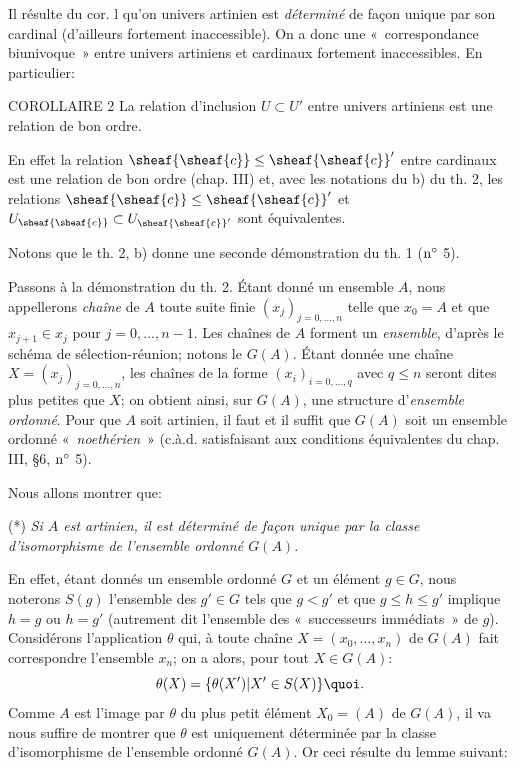 Il résulte du cor. l qu'on univers artinien est \emph{déterminé} de
façon unique par son cardinal (d'ailleurs fortement inaccessible).
On a donc une « correspondance biunivoque » entre univers
artiniens et cardinaux fortement inaccessibles. En particulier:

\begin{enonce*}{COROLLAIRE 2}
La relation d'inclusion $U\subset U'$ entre univers artiniens est
une relation de bon ordre.
\end{enonce*}

En effet la relation $\sheaf{\sheaf{c}}\leq \sheaf{\sheaf{c}}'$
entre cardinaux est une relation de bon ordre (chap. III) et, avec
les notations du b) du th. 2, les relations $\sheaf{\sheaf{c}}\leq
\sheaf{\sheaf{c}}'$ et $U_{\sheaf{\sheaf{c}}}\subset
U_{\sheaf{\sheaf{c}}'}$ sont équivalentes.

Notons que le th. 2, b) donne une seconde démonstration du th. 1
(${\rm n^{\circ}}$ 5).

Passons à la démonstration du th. 2. Étant donné un ensemble $A$,
nous appellerons \emph{chaîne} de $A$ toute suite finie
$(x_j)_{j=0,\ldots,n}$ telle que $x_0=A$ et que $x_{j+1}\in x_j$
pour $j=0,\ldots,n-1$. Les chaînes de $A$ forment un\pageoriginale
\emph{ensemble}, d'après le schéma de sélection-réunion; notons le
$G(A)$. Étant donnée une chaîne $X=(x_j)_{j=0,\ldots,n}$, les
chaînes de la forme $(x_i)_{i=0,\ldots,q}$ avec $q\leq n$ seront
dites plus petites que $X$; on obtient ainsi, sur $G(A)$, une
structure d'\emph{ensemble ordonné}. Pour que $A$ soit artinien, il
faut et il suffit que $G(A)$ soit un ensemble ordonné
« \emph{noethérien} » (c.à.d. satisfaisant aux conditions
équivalentes du chap. III, \S 6, ${\rm n^{\circ}}$ 5).

Nous allons montrer que:

\noindent (*) \emph{Si $A$ est artinien, il est déterminé de façon
unique par la classe d'isomorphisme de l'ensemble ordonné $G(A)$.}

En effet, étant donnés un ensemble ordonné $G$ et un élément $g\in
G$, nous noterons $S(g)$ l'ensemble des $g'\in G$ tels que $g<g'$ et
que $g\leq h\leq g'$ implique $h=g$ ou $h=g'$ (autrement dit
l'ensemble des « successeurs immédiats » de $g$). Considérons
l'application $\theta$ qui, à toute chaîne $X=(x_0,\ldots,x_n)$ de
$G(A)$ fait correspondre l'ensemble $x_n$; on a alors, pour tout
$X\in G(A)$:
$$
\theta(X)=\{\theta(X')| X'\in S(X)\}{\quoi}.
$$
Comme $A$ est l'image par $\theta$ du plus petit élément $X_0=(A)$
de $G(A)$, il va nous suffire de montrer que $\theta$ est uniquement
déterminée par la classe d'isomorphisme de l'ensemble ordonné
$G(A)$. Or ceci résulte du lemme suivant:


